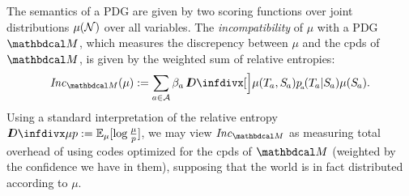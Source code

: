 \documentclass[twoside]{article}
\begin{document}


The semantics of a PDG are given by two scoring functions over joint distributions $\mu(\mathcal N)$ over all variables.
The \emph{incompatibility} of $\mu$ with a PDG $\dg M$, which
measures the discrepency between $\mu$ and the cpds of $\dg M$,
is given by the weighted sum of relative entropies:
\begin{align*}
    \Inc_{\dg M}(\mu) :=
        \sum_{a \in \Ar} \beta_a\, \kldiv[\Big]{\mu(\Tgt a,\Src a)}{p\ssub a(\Tgt a | \Src a) \mu(\Src a)}.
\end{align*}
Using a standard interpretation of the relative entropy $\kldiv{\mu}{p} := \Ex_{\mu}[\log \frac\mu p]$, we may view $\Inc_{\dg M}$ as measuring total overhead of using codes optimized for the cpds of $\dg M$ (weighted by the confidence we have in them), supposing that the world is in fact distributed according to $\mu$.
\end{document}
